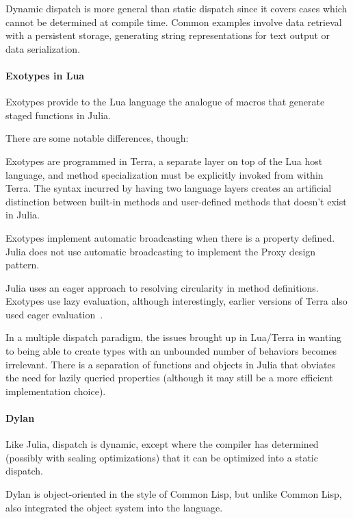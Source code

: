 \documentclass[pldi]{sigplanconf-pldi15}
\begin{document}
Dynamic dispatch is more general than static dispatch since it covers cases
which cannot be determined at compile time.  Common examples involve data
retrieval with a persistent storage, generating string representations for text
output or data serialization.\cite{Shields1998}

\paragraph{Exotypes in Lua}
Exotypes\cite{exotypes} provide to the Lua language\cite{lua} the analogue of
macros that generate staged functions\cite{stagedfunc} in Julia.

There are some notable differences, though:

Exotypes are programmed in Terra,\cite{terra} a separate layer on top of the
Lua host language, and method specialization must be explicitly invoked from
within Terra. The syntax incurred by having two language layers creates an
artificial distinction between built-in methods and user-defined methods that
doesn't exist in Julia.

Exotypes implement automatic broadcasting when there is a
 property defined. Julia does not use automatic
broadcasting to implement the Proxy design pattern.

Julia uses an eager approach to resolving circularity in method definitions.
Exotypes use lazy evaluation, although interestingly, earlier versions of Terra
also used eager evaluation~\cite{terra}.


In a multiple dispatch paradigm, the issues brought up in Lua/Terra in wanting
to being able to create types with an unbounded number of behaviors becomes
irrelevant. There is a separation of functions and objects in Julia that
obviates the need for lazily queried properties (although it may still be a
more efficient implementation choice).

\paragraph{Dylan}

Like Julia, dispatch is dynamic, except where the compiler has determined
(possibly with sealing optimizations) that it can be optimized into a static
dispatch.

Dylan is object-oriented in the style of Common Lisp, but unlike Common Lisp,
also integrated the object system into the language.
\end{document}
